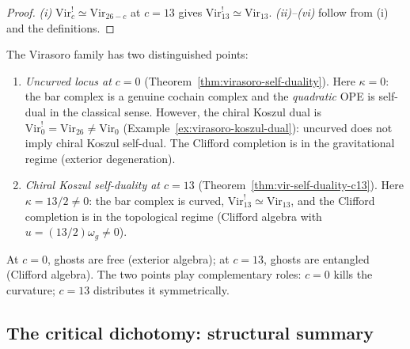 \begin{proof}
\emph{(i)} $\mathrm{Vir}_c^! \simeq \mathrm{Vir}_{26-c}$ at $c = 13$
gives $\mathrm{Vir}_{13}^! \simeq \mathrm{Vir}_{13}$.
\emph{(ii)--(vi)} follow from (i) and the definitions.
\end{proof}

\begin{remark}
\label{rem:g9-two-self-dualities}
The Virasoro family has two distinguished points:
\begin{enumerate}[label=\textup{(\alph*)}]
\item \emph{Uncurved locus at $c = 0$}
(Theorem~\ref{thm:virasoro-self-duality}). Here $\kappa = 0$: the bar
complex is a genuine cochain complex and the \emph{quadratic} OPE
is self-dual in the classical sense. However, the chiral
Koszul dual is $\mathrm{Vir}_0^! = \mathrm{Vir}_{26} \neq
\mathrm{Vir}_0$
(Example~\ref{ex:virasoro-koszul-dual}): uncurved does not
imply chiral Koszul self-dual. The Clifford completion is in the
gravitational regime (exterior degeneration).

\item \emph{Chiral Koszul self-duality at $c = 13$}
(Theorem~\ref{thm:vir-self-duality-c13}). Here $\kappa = 13/2 \neq 0$:
the bar complex is curved, $\mathrm{Vir}_{13}^! \simeq \mathrm{Vir}_{13}$,
and the Clifford completion is in the topological
regime (Clifford algebra with $u = (13/2)\omega_g \neq 0$).
\end{enumerate}
At $c = 0$, ghosts are free (exterior algebra); at $c = 13$, ghosts
are entangled (Clifford algebra).
The two points play complementary roles: $c = 0$ kills the
curvature; $c = 13$ distributes it symmetrically.
\end{remark}

%
%

\subsection{The critical dichotomy: structural summary}
\label{subsec:dichotomy-summary}

